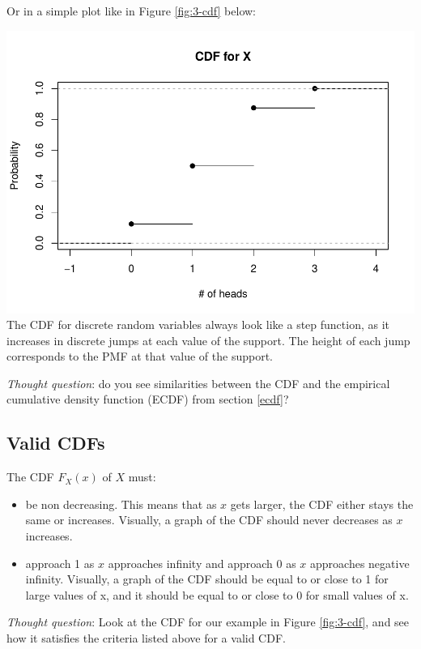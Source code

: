\documentclass[
]{book}
\providecommand{\tightlist}{%
  \setlength{\itemsep}{0pt}\setlength{\parskip}{0pt}}
\begin{document}
Or in a simple plot like in Figure \ref{fig:3-cdf} below:

\includegraphics{bookdown-demo_files/figure-latex/3-cdf-1.pdf}
The CDF for discrete random variables always look like a step function, as it increases in discrete jumps at each value of the support. The height of each jump corresponds to the PMF at that value of the support.

\emph{Thought question}: do you see similarities between the CDF and the empirical cumulative density function (ECDF) from section \ref{ecdf}?

\subsection{Valid CDFs}\label{valid-cdfs}

The CDF \(F_X(x)\) of \(X\) must:

\begin{itemize}
\tightlist
\item
  be non decreasing. This means that as \(x\) gets larger, the CDF either stays the same or increases. Visually, a graph of the CDF should never decreases as \(x\) increases.
\item
  approach 1 as \(x\) approaches infinity and approach 0 as \(x\) approaches negative infinity. Visually, a graph of the CDF should be equal to or close to 1 for large values of x, and it should be equal to or close to 0 for small values of x.
\end{itemize}

\emph{Thought question}: Look at the CDF for our example in Figure \ref{fig:3-cdf}, and see how it satisfies the criteria listed above for a valid CDF.
\end{document}
